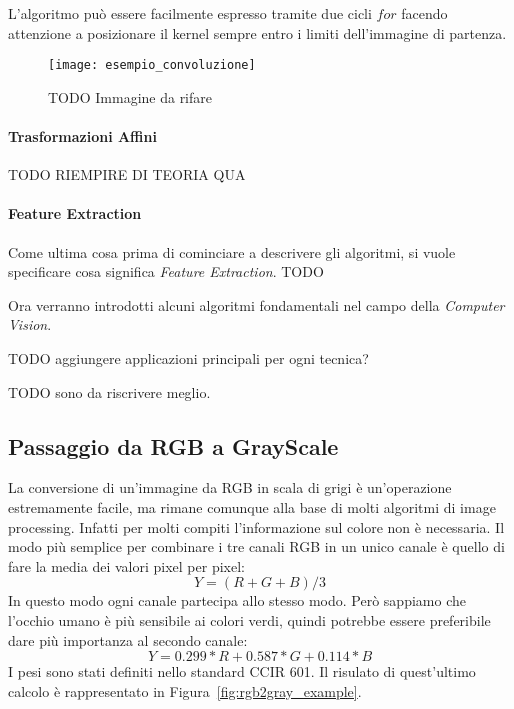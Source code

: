 L'algoritmo può essere facilmente espresso tramite due cicli $for$ facendo attenzione a posizionare il kernel sempre entro i limiti dell'immagine di partenza.


\begin{figure}[ht]
  \texttt{[image: esempio\_convoluzione]}
  \label{fig:conv_example}
  \caption{TODO Immagine da rifare}
\end{figure}

\paragraph{Trasformazioni Affini}

TODO RIEMPIRE DI TEORIA QUA

\paragraph{Feature Extraction}
Come ultima cosa prima di cominciare a descrivere gli algoritmi, si vuole specificare cosa significa \textit{Feature Extraction}.
TODO


\clearpage
Ora verranno introdotti alcuni algoritmi fondamentali nel campo della \textit{Computer Vision}.

TODO aggiungere applicazioni principali per ogni tecnica?

TODO sono da riscrivere meglio.


\subsection {Passaggio da RGB a GrayScale}
La conversione di un'immagine da RGB in scala di grigi è un'operazione estremamente facile, ma rimane comunque alla base di molti algoritmi di image processing.
Infatti per molti compiti l'informazione sul colore non è necessaria.
Il modo più semplice per combinare i tre canali RGB in un unico canale è quello di fare la media dei valori pixel per pixel:
\begin{equation}
  Y = (R + G + B)/3
\end{equation}
\label{eq:rgb2gray_avg}
In questo modo ogni canale partecipa allo stesso modo.
Però sappiamo che l'occhio umano è più sensibile ai colori verdi, quindi potrebbe essere preferibile dare più importanza al secondo canale:
\begin{equation}
  Y = 0.299*R + 0.587*G + 0.114*B
\end{equation}
\label{eq:rgb2gray}
I pesi sono stati definiti nello standard CCIR 601.
Il risulato di quest'ultimo calcolo è rappresentato in Figura~\ref{fig:rgb2gray_example}.

